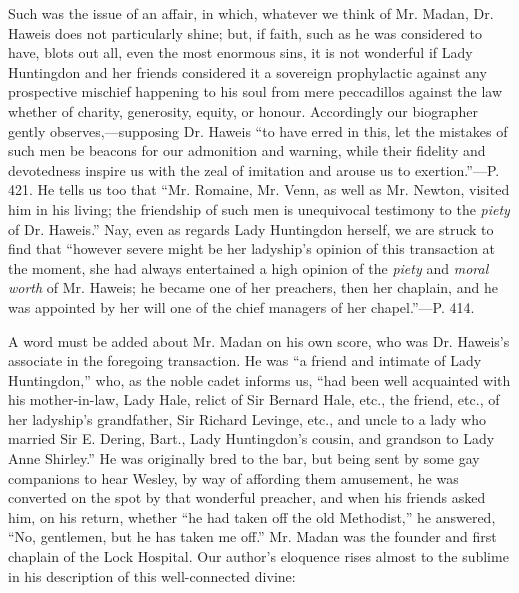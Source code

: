 Such was the issue of an affair, in which,
whatever we think of Mr. Madan, Dr. Haweis does not particularly
shine; but, if faith, such as he was considered to have, blots out
all, even the most enormous sins, it is not wonderful if Lady
Huntingdon and her friends considered it a sovereign prophylactic
against any prospective mischief happening to his soul from mere
peccadillos against the law whether of charity, generosity, equity, or
honour. Accordingly our biographer gently observes,—supposing Dr.
Haweis ``to have erred in this, let the mistakes of such men be beacons
for our admonition and warning, while their fidelity and devotedness
inspire us with the zeal of imitation and arouse us to exertion.''—P.
421. He tells us too that ``Mr. Romaine, Mr. Venn, as well as Mr.
Newton, visited him in his living; the friendship of such men is
unequivocal testimony to the \emph{piety} of Dr. Haweis.'' Nay, even as
regards Lady Huntingdon herself, we are struck to find that
``however severe might be her ladyship's opinion of this
transaction at the moment, she had always entertained a high opinion
of the \emph{piety} and \emph{moral worth} of Mr. Haweis; he became
one of her preachers, then her chaplain, and he was appointed by her
will one of the chief managers of her chapel.''—P. 414.

A word must be added about Mr. Madan on his own
score, who was Dr. Haweis's associate in the foregoing transaction. He
was ``a friend and intimate of Lady Huntingdon,'' who, as the noble
cadet informs us, ``had been well acquainted with his mother-in-law,
Lady Hale, relict of Sir Bernard Hale, etc., the friend, etc., of her
ladyship's grandfather, Sir Richard Levinge, etc., and uncle to a lady
who married Sir E. Dering, Bart., Lady Huntingdon's cousin, and
grandson to Lady Anne Shirley.'' He was originally bred to the bar, but
being sent by some gay companions to hear Wesley, by way of affording
them amusement, he was converted on the spot by that wonderful
preacher, and when his friends asked him, on his return, whether ``he
had taken off the old Methodist,'' he answered, ``No, gentlemen, but he
has taken me off.'' Mr. Madan was the founder and first chaplain of the
Lock Hospital. Our author's eloquence rises almost to the sublime in
his description of this well-connected divine:


